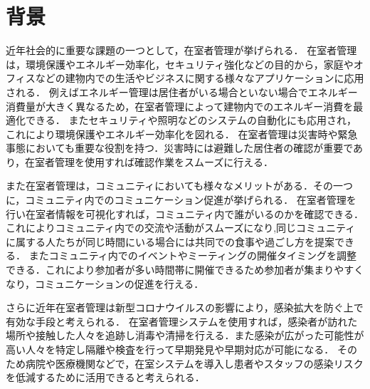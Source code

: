 





\section{背景}\label{1.1}
近年社会的に重要な課題の一つとして，在室者管理が挙げられる．
在室者管理は，環境保護やエネルギー効率化，セキュリティ強化などの目的から，家庭やオフィスなどの建物内での生活やビジネスに関する様々なアプリケーションに応用される．
例えばエネルギー管理は居住者がいる場合といない場合でエネルギー消費量が大きく異なるため，在室者管理によって建物内でのエネルギー消費を最適化できる．
またセキュリティや照明などのシステムの自動化にも応用され，これにより環境保護やエネルギー効率化を図れる．
在室者管理は災害時や緊急事態においても重要な役割を持つ．災害時には避難した居住者の確認が重要であり，在室者管理を使用すれば確認作業をスムーズに行える．

また在室者管理は，コミュニティにおいても様々なメリットがある．その一つに，コミュニティ内でのコミュニケーション促進が挙げられる．
在室者管理を行い在室者情報を可視化すれば，コミュニティ内で誰がいるのかを確認できる．これによりコミュニティ内での交流や活動がスムーズになり,同じコミュニティに属する人たちが同じ時間にいる場合には共同での食事や過ごし方を提案できる．
またコミュニティ内でのイベントやミーティングの開催タイミングを調整できる．これにより参加者が多い時間帯に開催できるため参加者が集まりやすくなり，コミュニケーションの促進を行える．

さらに近年在室者管理は新型コロナウイルスの影響により，感染拡大を防ぐ上で有効な手段と考えられる．
在室者管理システムを使用すれば，感染者が訪れた場所や接触した人々を追跡し消毒や清掃を行える．また感染が広がった可能性が高い人々を特定し隔離や検査を行って早期発見や早期対応が可能になる．
そのため病院や医療機関などで，在室システムを導入し患者やスタッフの感染リスクを低減するために活用できると考えられる．

